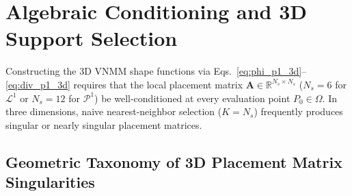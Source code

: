 \documentclass[preprint,12pt]{elsarticle}
\newcommand{\R}{\mathbb{R}}
\begin{document}
\section{Algebraic Conditioning and 3D Support Selection}
\label{sec:conditioning}

Constructing the 3D VNMM shape functions via Eqs.~\eqref{eq:phi_p1_3d}--\eqref{eq:div_p1_3d} requires that the local placement matrix $\mathbf{A} \in \R^{N_s \times N_s}$ ($N_s = 6$ for $\mathcal{L}^1$ or $N_s = 12$ for $\mathcal{P}^1$) be well-conditioned at every evaluation point $P_0 \in \Omega$. In three dimensions, naive nearest-neighbor selection ($K = N_s$) frequently produces singular or nearly singular placement matrices.

\subsection{Geometric Taxonomy of 3D Placement Matrix Singularities}
\label{subsec:singularity_taxonomy_3d}
\end{document}
